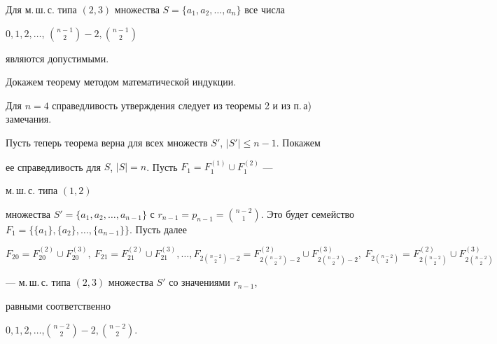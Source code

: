  


 


\begin{thm} 


Для м.\,ш.\,с. типа $(2,3)$ множества $S=\{a_1,a_2,\dotsc,a_n\}$ все числа 


$0,1,2,\dotsc$, $\binom{n-1}{2}-2, \binom{n-1}{2}$




являются допустимыми. 


\end{thm} 


 


 


\begin{pf} 


Докажем теорему методом математической индукции. 


Для $n=4$ справедливость утверждения следует из теоремы 2 и из п.\,а) замечания. 


Пусть теперь теорема верна для всех множеств $S'$, $|S'|\le n-1$. Покажем 


ее справедливость для $S$, $|S|=n$. Пусть $F_1=F_1^{(1)}\cup F_1^{(2)}$ --- 


м.\,ш.\,с. типа $(1,2)$ 


множества $S'=\{a_1,a_2,\dotsc,a_{n-1}\}$ с $r_{n-1}=p_{n-1}= 


\binom{n-2}{1}$. Это будет семейство $F_1=\big\{\{a_1\},\{a_2\},\dotsc, 


\{a_{n-1}\}\big\}$. Пусть далее 


$$ 


F_{20}=F^{(2)}_{20}\cup F^{(3)}_{20},\ F_{21}=F^{(2)}_{21}\cup 


F^{(3)}_{21},\dotsc, F_{2\binom{n-2}{2}-2}= 


F_{2\binom{n-2}{2}-2}^{(2)}\cup F_{2\binom{n-2}{2}-2}^{(3)}, 


\ F_{2\binom{n-2}{2}}=F_{2\binom{n-2}{2}}^{(2)}\cup 


F_{2\binom{n-2}{2}}^{(3)} 


$$ 


--- м.\,ш.\,с. типа $(2,3)$ множества $S'$ со значениями $r_{n-1}$, 


равными соответственно


$0,1,2,\dotsc$,\linebreak $\binom{n-2}{2}-2, \binom{n-2}{2}$. 





\end{pf}
